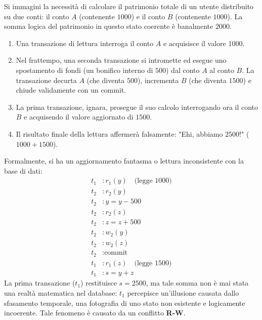 Si immagini la necessità di calcolare il patrimonio totale di un utente distribuito su due conti: il conto $A$ (contenente $1000$) e il conto $B$ (contenente $1000$). La somma logica del patrimonio in questo stato coerente è banalmente $2000$.
\begin{enumerate}
    \item Una transazione di lettura interroga il conto $A$ e acquisisce il valore $1000$.
    \item Nel frattempo, una seconda transazione si intromette ed esegue uno spostamento di fondi (un bonifico interno di $500$) dal conto $A$ al conto $B$. La transazione decurta $A$ (che diventa $500$), incrementa $B$ (che diventa $1500$) e chiude validamente con un commit.
    \item La prima transazione, ignara, prosegue il suo calcolo interrogando ora il conto $B$ e acquisendo il valore aggiornato di $1500$.
    \item Il risultato finale della lettura affermerà falsamente: "Ehi, abbiamo $2500$!" ($1000 + 1500$).
\end{enumerate}

Formalmente, si ha un aggiornamento fantasma o lettura inconsistente con la base di dati:
\begin{align*}
    t_1&: r_1(y) \quad \text{(legge 1000)} \\
    t_2&: r_2(y) \\
    t_2&: y = y - 500 \\
    t_2&: r_2(z) \\
    t_2&: z = z + 500 \\
    t_2&: w_2(y) \\
    t_2&: w_2(z) \\
    t_2&: \text{commit} \\
    t_1&: r_1(z) \quad \text{(legge 1500)} \\
    t_1&: s = y + z
\end{align*}
La prima transazione ($t_1$) restituisce $s = 2500$, ma tale somma non è mai stata una realtà matematica nel database: $t_1$ percepisce un'illusione causata dallo sfasamento temporale, una fotografia di uno stato non esistente e logicamente incoerente. Tale fenomeno è causato da un conflitto \textbf{R-W}.

